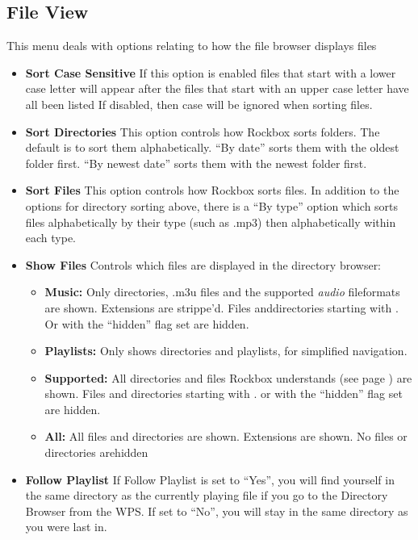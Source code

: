 \begin{itemize}
  \subsection{File View}
  This menu deals with options relating to how the file browser displays files
  
  \begin{itemize}
  \item \textbf{Sort Case Sensitive}
    If this option is enabled files that start with a lower case letter will appear after the files that start with an upper case letter have all been listed  If disabled, then case will be ignored when sorting files.
  \item \textbf{Sort Directories}
    This option controls how Rockbox sorts folders.  The default is to sort them alphabetically.  ``By date'' sorts them with the oldest folder first.  ``By newest date'' sorts them with the newest folder first.
    
  \item \textbf{Sort Files}
    This option controls how Rockbox sorts files.  In addition to the options for directory sorting above, there is a ``By type'' option which sorts files alphabetically by their type (such as .mp3) then alphabetically within each type.
    
  \item \textbf{\label{ref:ShowFiles}Show Files}
    Controls which files are displayed in the directory browser:
    
    \begin{itemize}
    \item \textbf{Music: }
      Only directories, .m3u files and the supported \emph{audio} fileformats are shown. Extensions are strippe'd. Files anddirectories starting with . Or with the ``hidden'' flag set are hidden.
    \item \textbf{Playlists:} 
      Only shows directories and playlists, for simplified navigation.
    \item \textbf{Supported:} 
      All directories and files Rockbox understands (see page \pageref{ref:Supportedfileformats}) are shown. Files and directories starting with . or with the ``hidden'' flag set are hidden.
    \item \textbf{All:}
      All files and directories are shown. Extensions are shown. No files or directories arehidden
    \end{itemize}
    
  \item \textbf{Follow Playlist}
    If Follow Playlist is set to ``Yes'', you will find yourself in the same directory as the currently playing file if you go to the Directory Browser from the WPS. If set to ``No'', you will stay in the same directory as you were last in.
    

\end{itemize}
\end{itemize}
